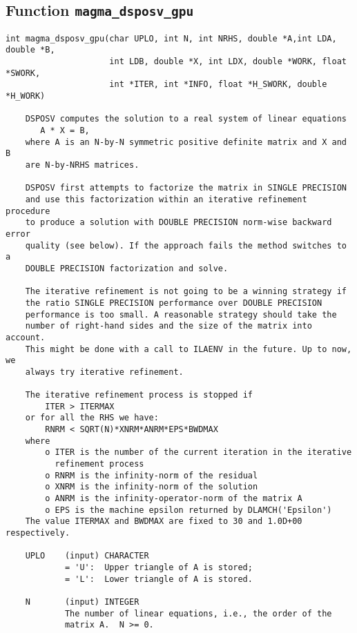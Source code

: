 \documentclass[10pt]{book}
\begin{document}
\subsection{Function {\tt {\bf magma\_dsposv\_gpu}}}
\begin{verbatim}
int magma_dsposv_gpu(char UPLO, int N, int NRHS, double *A,int LDA, double *B, 
                     int LDB, double *X, int LDX, double *WORK, float *SWORK,
                     int *ITER, int *INFO, float *H_SWORK, double *H_WORK)

    DSPOSV computes the solution to a real system of linear equations
       A * X = B,
    where A is an N-by-N symmetric positive definite matrix and X and B
    are N-by-NRHS matrices.

    DSPOSV first attempts to factorize the matrix in SINGLE PRECISION
    and use this factorization within an iterative refinement procedure
    to produce a solution with DOUBLE PRECISION norm-wise backward error
    quality (see below). If the approach fails the method switches to a
    DOUBLE PRECISION factorization and solve.

    The iterative refinement is not going to be a winning strategy if
    the ratio SINGLE PRECISION performance over DOUBLE PRECISION
    performance is too small. A reasonable strategy should take the
    number of right-hand sides and the size of the matrix into account.
    This might be done with a call to ILAENV in the future. Up to now, we
    always try iterative refinement.

    The iterative refinement process is stopped if
        ITER > ITERMAX
    or for all the RHS we have:
        RNRM < SQRT(N)*XNRM*ANRM*EPS*BWDMAX
    where
        o ITER is the number of the current iteration in the iterative
          refinement process
        o RNRM is the infinity-norm of the residual
        o XNRM is the infinity-norm of the solution
        o ANRM is the infinity-operator-norm of the matrix A
        o EPS is the machine epsilon returned by DLAMCH('Epsilon')
    The value ITERMAX and BWDMAX are fixed to 30 and 1.0D+00 respectively.

    UPLO    (input) CHARACTER
            = 'U':  Upper triangle of A is stored;
            = 'L':  Lower triangle of A is stored.

    N       (input) INTEGER
            The number of linear equations, i.e., the order of the
            matrix A.  N >= 0.


\end{verbatim}
\end{document}

